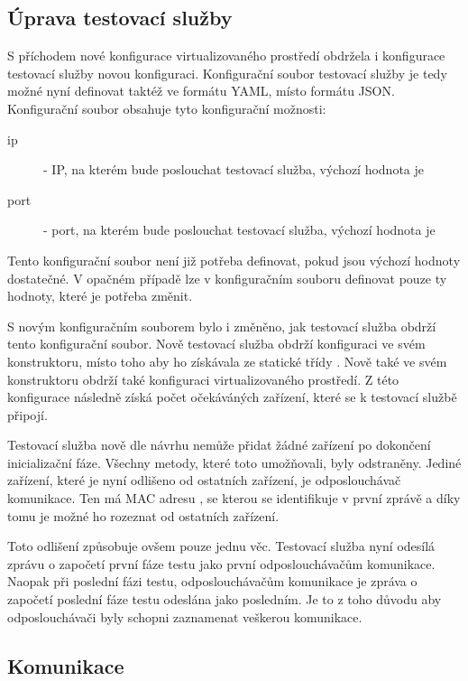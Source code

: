 \subsection{Úprava testovací služby}\label{sec:test_service_changes}

S příchodem nové konfigurace virtualizovaného prostředí obdržela i konfigurace testovací služby novou konfiguraci. Konfigurační soubor testovací služby je tedy možné nyní definovat taktéž ve formátu YAML, místo formátu JSON. Konfigurační soubor obsahuje tyto konfigurační možnosti:

\begin{description}
    \item[ip] - IP, na kterém bude poslouchat testovací služba, výchozí hodnota je 
    \item[port] - port, na kterém bude poslouchat testovací služba, výchozí hodnota je 
\end{description}


Tento konfigurační soubor není již potřeba definovat, pokud jsou výchozí hodnoty dostatečné. V opačném případě lze v konfiguračním souboru definovat pouze ty hodnoty, které je potřeba změnit. 

S novým konfiguračním souborem bylo i změněno, jak testovací služba obdrží tento konfigurační soubor. Nově testovací služba obdrží konfiguraci ve svém konstruktoru, místo toho aby ho získávala ze statické třídy . Nově také ve svém konstruktoru obdrží také konfiguraci virtualizovaného prostředí. Z této konfigurace následně získá počet očekáváných zařízení, které se k testovací službě připojí. 

Testovací služba nově dle návrhu nemůže přidat žádné zařízení po dokončení inicializační fáze. Všechny metody, které toto umožňovali, byly odstraněny. Jediné zařízení, které je nyní odlišeno od ostatních zařízení, je odposlouchávač komunikace. Ten má MAC adresu , se kterou se identifikuje v první zprávě a díky tomu je možné ho rozeznat od ostatních zařízení. 

Toto odlišení způsobuje ovšem pouze jednu věc. Testovací služba nyní odesílá zprávu o započetí první fáze testu jako první odposlouchávačům komunikace. Naopak při poslední fázi testu, odposlouchávačům komunikace je zpráva o započetí poslední fáze testu odeslána jako posledním. Je to z toho důvodu aby odposlouchávači byly schopni zaznamenat veškerou komunikace. 

\subsection{Komunikace}

